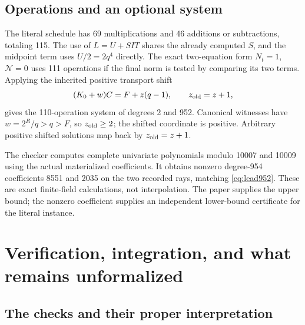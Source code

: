 \documentclass[11pt,a4paper]{article}
\theoremstyle{definition}
\theoremstyle{remark}
\numberwithin{equation}{section}
\begin{document}
\subsection{Operations and an optional system}

The literal schedule has 69 multiplications and 46 additions or
subtractions, totaling 115. The use of $L=U+SIT$ shares the already
computed $S$, and the midpoint term uses $U/2=2q^4$ directly.
The exact two-equation form $N_t=1$, $\mathcal N=0$ uses 111
operations if the final norm is tested by comparing its two terms.
Applying the inherited positive transport shift
\[
 (K_0+w)C=F+z(q-1),\qquad z_{\rm old}=z+1,
\]
gives the 110-operation system of degrees 2 and 952.
Canonical witnesses have $w=2^R/q>q>F$, so $z_{\rm old}\ge2$;
the shifted coordinate is positive. Arbitrary positive shifted solutions
map back by $z_{\rm old}=z+1$.

The checker computes complete univariate polynomials modulo 10007 and
10009 using the actual materialized coefficients. It obtains nonzero
degree-954 coefficients 8551 and 2035 on the two recorded rays, matching
\eqref{eq:lead952}. These are exact finite-field calculations, not
interpolation. The paper supplies the upper bound; the nonzero coefficient
supplies an independent lower-bound certificate for the literal instance.



\section{Verification, integration, and what remains unformalized}
\label{sec:formal-status}

\subsection{The checks and their proper interpretation}
\end{document}
